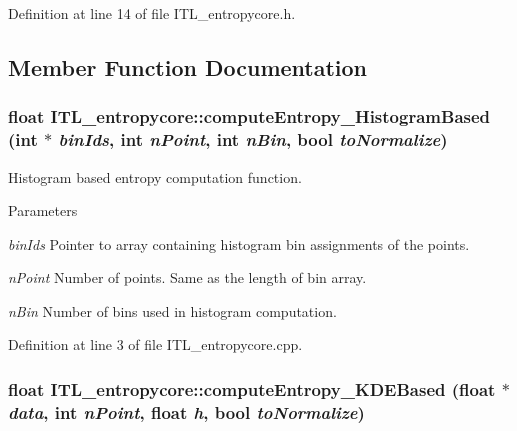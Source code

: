 Definition at line 14 of file ITL\_\-entropycore.h.



\subsection{Member Function Documentation}
\hypertarget{classITL__entropycore_afd605a02922df607f43d0b1ec3248e7d}{
\subsubsection[{computeEntropy\_\-HistogramBased}]{\setlength{\rightskip}{0pt plus 5cm}float ITL\_\-entropycore::computeEntropy\_\-HistogramBased (int $\ast$ {\em binIds}, \/  int {\em nPoint}, \/  int {\em nBin}, \/  bool {\em toNormalize})}}
\label{classITL__entropycore_afd605a02922df607f43d0b1ec3248e7d}


Histogram based entropy computation function. 


\begin{DoxyParams}{Parameters}
\item[{\em binIds}]Pointer to array containing histogram bin assignments of the points. \item[{\em nPoint}]Number of points. Same as the length of bin array. \item[{\em nBin}]Number of bins used in histogram computation. \end{DoxyParams}


Definition at line 3 of file ITL\_\-entropycore.cpp.

\hypertarget{classITL__entropycore_a44a6bc62c22f739825a4b7dcf10ab43a}{
\subsubsection[{computeEntropy\_\-KDEBased}]{\setlength{\rightskip}{0pt plus 5cm}float ITL\_\-entropycore::computeEntropy\_\-KDEBased (float $\ast$ {\em data}, \/  int {\em nPoint}, \/  float {\em h}, \/  bool {\em toNormalize})}}
\label{classITL__entropycore_a44a6bc62c22f739825a4b7dcf10ab43a}


